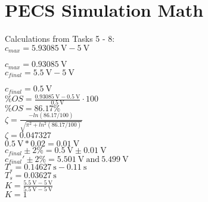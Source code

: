 \documentclass{report}
\begin{document}
\section{PECS Simulation Math}

Calculations from Tasks 5 - 8:\\

$c_{max} = \SI{5.93085}{\volt} - \SI{5}{\volt}$

$c_{max} = \SI{0.93085}{\volt}$\\

$c_{final} = \SI{5.5}{\volt} - \SI{5}{\volt}$

$c_{final} = \SI{0.5}{\volt}$\\

$\%OS = \frac{\SI{0.93085}{\volt}-\SI{0.5}{\volt}}{\SI{0.5}{\volt}} \cdot 100$\\

$\%OS =  86.17\%$\\

$\zeta = \frac{-ln(86.17/100)}{\sqrt{\pi^2+ln^2(86.17/100)}}$\\

$\zeta = 0.047327$\\

$\SI{0.5}{\volt}*0.02 = \SI{0.01}{\volt}$\\
 
$c_{final}\pm 2\% = \SI{0.5}{\volt} \pm\SI{0.01}{\volt}$\\
 
$c_{final}'\pm 2\% = \SI{5.501}{\volt} \:\textrm{and} \: \SI{5.499}{\volt}$\\
 
$T_s = \SI{0.14627}{\second} - \SI{0.11}{\second}$\\
 
$T_s = \SI{0.03627}{\second}$\\

$K = \frac{\SI{5.5}{\volt} - \SI{5}{\volt}}{\SI{5.5}{\volt} - \SI{5}{\volt}}$\\
 
$K = 1$
 
 
\end{document}

